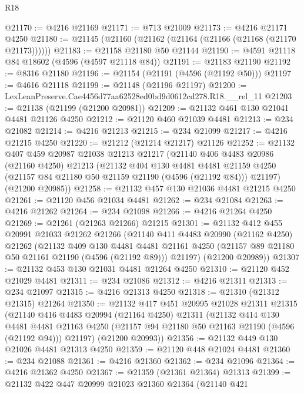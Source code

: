 \begin{lexlean}{R18}
\begin{coremodule}
@21170 := @4216 @21169
@21171 := @713 @21009
@21173 := @4216 @21171 @4250
@21180 := @21145 (@21160 (@21162 (@21164 (@21166 (@21168 (@21170 @21173))))))
@21183 := @21158 @21180 @50 @21144
@21190 := @4591 @21118 @84 @18602 (@4596 (@4597 @21118 @84))
@21191 := @21183 @21190
@21192 := @8316 @21180
@21196 := @21154 (@21191 (@4596 (@21192 @50)))
@21197 := @4616 @21118
@21199 := @21148 (@21196 @21197)
@21200 := LexLeanPreserve.Cae4456d77aa62528ed0bd9d0612cd278.R18.__rel_11
@21203 := @21138 (@21199 (@21200 @20981))
@21209 := @21132 @461 @130 @21041 @4481 @21126 @4250
@21212 := @21120 @460 @21039 @4481
@21213 := @234 @21082
@21214 := @4216 @21213
@21215 := @234 @21099
@21217 := @4216 @21215 @4250
@21220 := @21212 (@21214 @21217) @21126
@21252 := @21132
    @407
    @459
    @20987
    @21038
    @21213
    @21217
    (@21140
      @406
      @4483
      @20986
      (@21160 @4250)
      @21213
      (@21132
        @404
        @130
        @4481
        @4481
        @21159
        @4250
        (@21157 @84 @21180 @50 @21159 @21190 (@4596 (@21192 @84)))
        @21197)
      (@21200 @20985))
@21258 := @21132 @457 @130 @21036 @4481 @21215 @4250
@21261 := @21120 @456 @21034 @4481
@21262 := @234 @21084
@21263 := @4216 @21262
@21264 := @234 @21098
@21266 := @4216 @21264 @4250
@21269 := @21261 (@21263 @21266) @21215
@21301 := @21132
    @412
    @455
    @20991
    @21033
    @21262
    @21266
    (@21140
      @411
      @4483
      @20990
      (@21162 @4250)
      @21262
      (@21132
        @409
        @130
        @4481
        @4481
        @21161
        @4250
        (@21157 @89 @21180 @50 @21161 @21190 (@4596 (@21192 @89)))
        @21197)
      (@21200 @20989))
@21307 := @21132 @453 @130 @21031 @4481 @21264 @4250
@21310 := @21120 @452 @21029 @4481
@21311 := @234 @21086
@21312 := @4216 @21311
@21313 := @234 @21097
@21315 := @4216 @21313 @4250
@21318 := @21310 (@21312 @21315) @21264
@21350 := @21132
    @417
    @451
    @20995
    @21028
    @21311
    @21315
    (@21140
      @416
      @4483
      @20994
      (@21164 @4250)
      @21311
      (@21132
        @414
        @130
        @4481
        @4481
        @21163
        @4250
        (@21157 @94 @21180 @50 @21163 @21190 (@4596 (@21192 @94)))
        @21197)
      (@21200 @20993))
@21356 := @21132 @449 @130 @21026 @4481 @21313 @4250
@21359 := @21120 @448 @21024 @4481
@21360 := @234 @21088
@21361 := @4216 @21360
@21362 := @234 @21096
@21364 := @4216 @21362 @4250
@21367 := @21359 (@21361 @21364) @21313
@21399 := @21132
    @422
    @447
    @20999
    @21023
    @21360
    @21364
    (@21140
      @421

\end{coremodule}
\end{lexlean}

